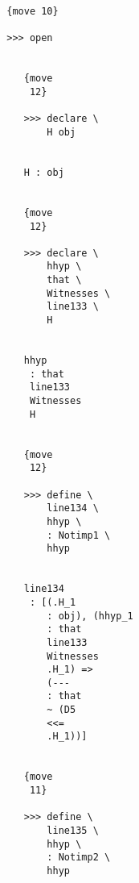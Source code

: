 \documentclass[12pt]{article}
\begin{document}
\begin{verbatim}
                                 {move 10}

                                 >>> open


                                    {move 
                                     12}

                                    >>> declare \
                                        H obj


                                    H : obj


                                    {move 
                                     12}

                                    >>> declare \
                                        hhyp \
                                        that \
                                        Witnesses \
                                        line133 \
                                        H


                                    hhyp 
                                     : that 
                                     line133 
                                     Witnesses 
                                     H


                                    {move 
                                     12}

                                    >>> define \
                                        line134 \
                                        hhyp \
                                        : Notimp1 \
                                        hhyp


                                    line134 
                                     : [(.H_1 
                                        : obj), (hhyp_1 
                                        : that 
                                        line133 
                                        Witnesses 
                                        .H_1) => 
                                        (--- 
                                        : that 
                                        ~ (D5 
                                        <<= 
                                        .H_1))]


                                    {move 
                                     11}

                                    >>> define \
                                        line135 \
                                        hhyp \
                                        : Notimp2 \
                                        hhyp



\end{verbatim}
\end{document}
